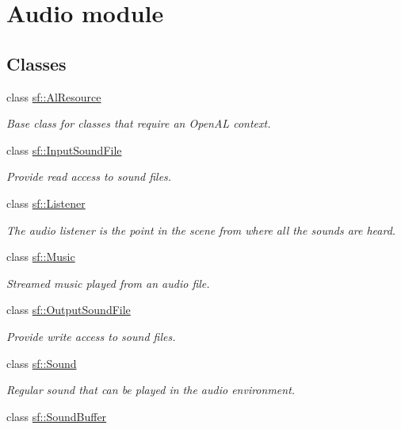 \hypertarget{group__audio}{}\section{Audio module}
\label{group__audio}
\subsection*{Classes}
\begin{DoxyCompactItemize}
\item 
class \hyperlink{classsf_1_1AlResource}{sf\+::\+Al\+Resource}
\begin{DoxyCompactList}\small\item\em Base class for classes that require an Open\+AL context. \end{DoxyCompactList}\item 
class \hyperlink{classsf_1_1InputSoundFile}{sf\+::\+Input\+Sound\+File}
\begin{DoxyCompactList}\small\item\em Provide read access to sound files. \end{DoxyCompactList}\item 
class \hyperlink{classsf_1_1Listener}{sf\+::\+Listener}
\begin{DoxyCompactList}\small\item\em The audio listener is the point in the scene from where all the sounds are heard. \end{DoxyCompactList}\item 
class \hyperlink{classsf_1_1Music}{sf\+::\+Music}
\begin{DoxyCompactList}\small\item\em Streamed music played from an audio file. \end{DoxyCompactList}\item 
class \hyperlink{classsf_1_1OutputSoundFile}{sf\+::\+Output\+Sound\+File}
\begin{DoxyCompactList}\small\item\em Provide write access to sound files. \end{DoxyCompactList}\item 
class \hyperlink{classsf_1_1Sound}{sf\+::\+Sound}
\begin{DoxyCompactList}\small\item\em Regular sound that can be played in the audio environment. \end{DoxyCompactList}\item 
class \hyperlink{classsf_1_1SoundBuffer}{sf\+::\+Sound\+Buffer}

\end{DoxyCompactItemize}
